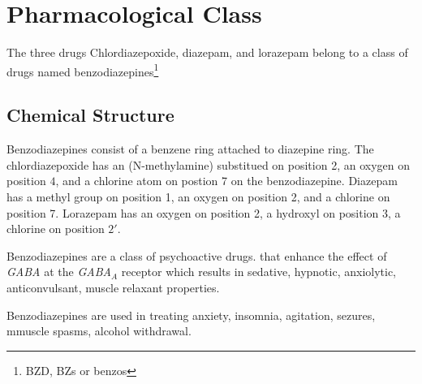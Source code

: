\chapter{Pharmacological Class}
The three drugs Chlordiazepoxide, diazepam, and lorazepam belong to a class of drugs named benzodiazepines\footnote{BZD, BZs or benzos}

\section{Chemical Structure}
Benzodiazepines consist of a benzene ring attached to diazepine ring.
The chlordiazepoxide has an (N-methylamine) substitued on position 2, an oxygen on position $4$, and a chlorine atom on postion 7 on the benzodiazepine.
Diazepam has a methyl group on position 1, an oxygen on position 2, and a chlorine on position 7.
Lorazepam has an oxygen on position 2, a hydroxyl on position 3, a chlorine on position $2'$.

Benzodiazepines are a class of psychoactive drugs. that enhance the effect of \emph{\uppercase{gaba}} at the \emph{GABA$_A$} receptor which results in sedative, hypnotic, anxiolytic, anticonvulsant, muscle relaxant properties.

Benzodiazepines are used in treating anxiety, insomnia, agitation, sezures, mmuscle spasms, alcohol withdrawal.\cite{}
